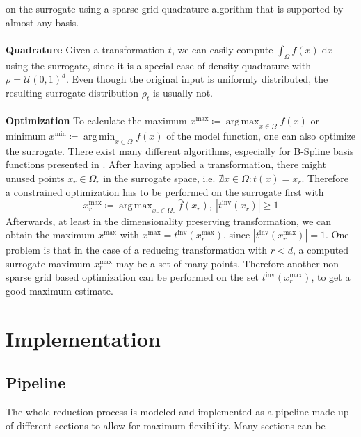 \documentclass[
  a4paper,  %
  twoside,  %
  bibliography=totoc,
  headsepline,
  cleardoublepage=empty,
  parskip=half,
  draft=false
]{scrbook}
\DeclareMathOperator*{\argmin}{arg\,min}
\DeclareMathOperator*{\argmax}{arg\,max}
\begin{document}
on the surrogate using a sparse grid quadrature algorithm that is supported by almost any basis.
\\
\\
\textbf{Quadrature}
Given a transformation $t$, we can easily compute $\int_{\Omega} f(x) \; \text{d}x$ using the surrogate, since it is a special case of density quadrature with $\rho=\mathcal{U}(0,1)^d$.
Even though the original input is uniformly distributed, the resulting surrogate distribution $\rho_t$ is usually not.
\\
\\
\textbf{Optimization}
To calculate the maximum $x^\text{max} \coloneqq \argmax_{x \in \Omega} f(x)$ or minimum $x^\text{min} \coloneqq \argmin_{x \in \Omega} f(x)$ of the model function, one can also optimize the surrogate. There exist many different algorithms, especially for B-Spline basis functions presented in \cite{}.
After having applied a transformation, there might unused points $x_r \in \Omega_r$ in the surrogate space, i.e. $\nexists x \in \Omega \colon t(x)=x_r$.
Therefore a constrained optimization has to be performed on the surrogate first with
\begin{equation}
x_{r}^\text{max} \coloneqq \argmax_{x_r \in \Omega_r} \hat{f}(x_r), ~ |t^{\text{inv}}(x_{r})|\geq 1
\end{equation}
Afterwards, at least in the dimensionality preserving transformation, we can obtain the maximum $x^\text{max}$ with $x^\text{max}=t^{\text{inv}}(x_{r}^\text{max})$, since $|t^{\text{inv}}(x_{r}^\text{max})|=1$.
One problem is that in the case of a reducing transformation with $r<d$, a computed surrogate maximum $x_{r}^\text{max}$ may be a set of many points.
Therefore another non sparse grid based optimization can be performed on the set $t^{\text{inv}}(x_{r}^\text{max})$, to get a good maximum estimate.


\chapter{Implementation}


\section{Pipeline}

The whole reduction process is modeled and implemented as a pipeline made up of different sections to allow for maximum flexibility.
Many sections can be
\end{document}
